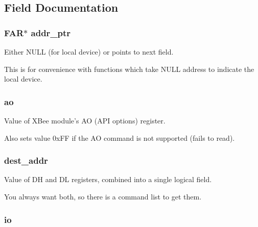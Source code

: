 \subsection{Field Documentation}
\hypertarget{structsxa__node__t_ae22454fb2324ac2f3c9ddc07fe24ae35}{
\subsubsection[{addr\-\_\-ptr}]{ {\bf F\-A\-R}$\ast$ addr\-\_\-ptr}}\label{structsxa__node__t_ae22454fb2324ac2f3c9ddc07fe24ae35}


Either N\-U\-L\-L (for local device) or points to next field. 

This is for convenience with functions which take N\-U\-L\-L address to indicate the local device. \hypertarget{structsxa__node__t_a4f850621475e7b60aa5aee84dda81a8f}{
\subsubsection[{ao}]{ ao}}\label{structsxa__node__t_a4f850621475e7b60aa5aee84dda81a8f}


Value of X\-Bee module's A\-O (A\-P\-I options) register. 

Also sets value 0x\-F\-F if the A\-O command is not supported (fails to read). \hypertarget{structsxa__node__t_abb357ccdd72453fd6f4ee76e18fde30c}{
\subsubsection[{dest\-\_\-addr}]{ dest\-\_\-addr}}\label{structsxa__node__t_abb357ccdd72453fd6f4ee76e18fde30c}


Value of D\-H and D\-L registers, combined into a single logical field. 

You always want both, so there is a command list to get them. \hypertarget{structsxa__node__t_a87711fd12194e90fe58291cf2ea6e30f}{
\subsubsection[{io}]{ io}}\label{structsxa__node__t_a87711fd12194e90fe58291cf2ea6e30f}



